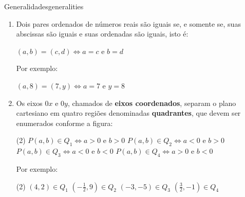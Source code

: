 \begin{proposition}{Generalidades}{generalities}
  \begin{enumerate}
    \item Dois pares ordenados de números reais são iguais se, e somente se, suas abscissas são iguais e 
      suas ordenadas são iguais, isto é:

      \vspace{.2cm}
      $(a, b) = (c, d) \iff  a = c \text{ e } b = d$

      \vspace{.2cm}
      Por exemplo:

      \vspace{.2cm}
      $(a, 8) = (7, y) \iff a = 7 \text{ e } y = 8$

    \vspace{.2cm}
    \item Os eixos $0x$ e $0y$, chamados de \textbf{eixos coordenados}, separam o plano cartesiano em quatro 
      regiões denominadas \textbf{quadrantes}, que devem ser enumerados conforme a figura:

    \vspace{.2cm}
    \begin{center}
    \end{center}

    \vspace{.2cm}
    \begin{tasks}(2)
      \task[] $P(a,b) \in Q_1 \iff a > 0 \text{ e } b > 0$
      \task[] $P(a,b) \in Q_2 \iff a < 0 \text{ e } b > 0$
      \task[] $P(a,b) \in Q_3 \iff a < 0 \text{ e } b < 0$
      \task[] $P(a,b) \in Q_4 \iff a > 0 \text{ e } b < 0$
    \end{tasks}

    \vspace{.2cm}
    Por exemplo:

    \vspace{.2cm}
    \begin{tasks}(2)
      \task[\#] $(4,2) \in Q_1$
      \task[\#] $(-\frac{1}{2},9) \in Q_2$ 
      \task[\#] $(-3,-5) \in Q_3$
      \task[\#] $(\frac{3}{2},-1) \in Q_4$
    \end{tasks}


\end{enumerate}
\end{proposition}
